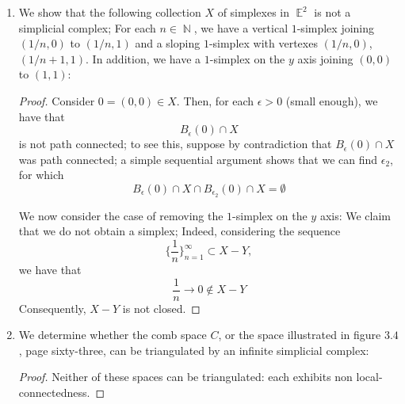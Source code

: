 \documentclass{book}
\DeclareMathOperator*{\N}{\mathbb{N}}
\DeclareMathOperator*{\E}{\mathbb{E}}
\begin{document}
\begin{enumerate}[(1)]
    \item We show that the following collection $X$ of simplexes in $\E^2$ is not a simplicial complex; For each $n \in \N$, we have a vertical $1$-simplex joining $(1/n,0)$ to $(1/n,1)$ and a sloping $1$-simplex with vertexes $(1/n,0)$, $(1/n+1,1)$. In addition, we have a $1$-simplex on the $y$ axis joining $(0,0)$ to $(1,1)$:
        \begin{proof} Consider $0 = (0,0) \in X$. Then, for each $\epsilon > 0$ (small enough), we have that 
            \[B_\epsilon (0) \cap X \]
            is not path connected; to see this, suppose by contradiction that $B_\epsilon (0) \cap X$ was path connected; a simple sequential argument shows that we can find $\epsilon_2$, for which 
            \[B_\epsilon (0) \cap X \cap B_{\epsilon_2} (0) \cap X = \emptyset\]
            \par We now consider the case of removing the $1$-simplex on the $y$ axis: We claim that we do not obtain a simplex; Indeed, considering the sequence 
            \[\{\frac{1}{n}\}_{n=1}^\infty \subset X - Y,\]
            we have that 
            \[\frac{1}{n} \rightarrow 0 \notin X - Y\]
            Consequently, $X - Y$ is not closed. 
        \end{proof}

    \item We determine whether the comb space $C$, or the space illustrated in figure $3.4$, page sixty-three, can be triangulated by an infinite simplicial complex: 
        \begin{proof} Neither of these spaces can be triangulated: each exhibits non local-connectedness. 
        \end{proof}


\end{enumerate}
\end{document}
